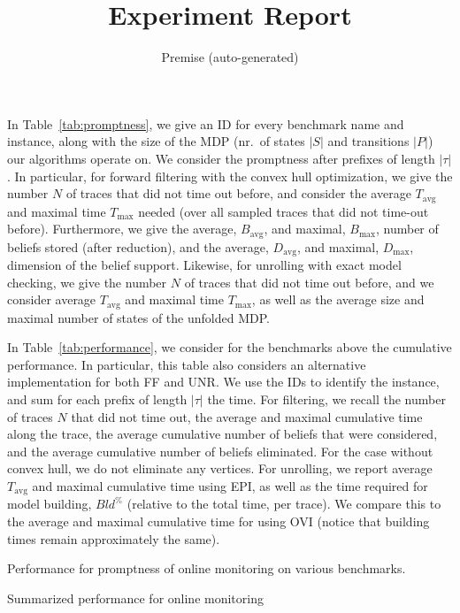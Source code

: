 \documentclass[10pt]{article}
\title{Experiment Report}
\author{Premise (auto-generated)}
\newcommand{\trace}{\tau}
\begin{document}
\maketitle


In Table~\ref{tab:promptness}, we give an ID for every benchmark name and instance, along with the size of the MDP (nr.\ of states $|S|$ and transitions $|P|$) our algorithms operate on.
We consider the promptness after prefixes of length $|\trace|$.
In particular, for forward filtering with the convex hull optimization, we give the number $N$ of traces that did not time out before, and consider the average $T_\text{avg}$ and maximal time $T_\text{max}$ needed (over all sampled traces that did not time-out before).
Furthermore, we give the average, $B_\text{avg}$, and maximal, $B_\text{max}$, number of beliefs stored (after reduction), and the average, $D_\text{avg}$, and maximal, $D_\text{max}$,  dimension of the belief support.
Likewise, for unrolling with exact model checking, we give the number $N$ of traces that did not time out before, and we consider average $T_\text{avg}$ and maximal time $T_\text{max}$, as well as the average size and maximal number of states of the unfolded MDP.

In Table~\ref{tab:performance}, we consider for the benchmarks above the cumulative performance. In particular, this table also considers an alternative implementation for both FF and UNR.
We use the IDs to identify the instance, and sum for each prefix of length $|\trace|$ the time.
For filtering, we recall the number of traces $N$ that did not time out, the average and maximal cumulative time along the trace, the average cumulative number of beliefs that were considered, and the average cumulative number of beliefs eliminated. For the case without convex hull, we do not eliminate any vertices.
For unrolling, we report average $T_\text{avg}$ and maximal cumulative time using EPI, as well as the time required for model building, $\mathit{Bld^{\%}}$ (relative to the total time, per trace).
We compare this to the average and maximal cumulative time for using OVI (notice that building times remain approximately the same).


\begin{table}
\centering
	\caption{Performance for promptness of online monitoring on various benchmarks.}
	{\footnotesize

}
\label{tab:promptness}
\end{table}
\begin{table}
\caption{Summarized performance for online monitoring}
\centering
{\footnotesize

}
\label{tab:performance}
\end{table}
\end{document}
